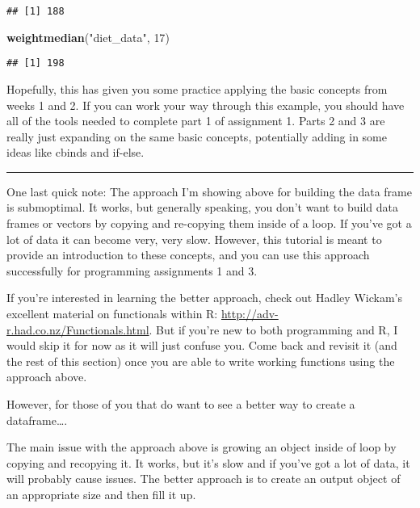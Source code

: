 \documentclass[
]{article}
\newenvironment{Shaded}{\begin{snugshade}}{\end{snugshade}}
\newcommand{\DecValTok}[1]{\textcolor[rgb]{0.00,0.00,0.81}{#1}}
\newcommand{\KeywordTok}[1]{\textcolor[rgb]{0.13,0.29,0.53}{\textbf{#1}}}
\newcommand{\NormalTok}[1]{#1}
\newcommand{\StringTok}[1]{\textcolor[rgb]{0.31,0.60,0.02}{#1}}
\begin{document}
\begin{verbatim}
## [1] 188
\end{verbatim}

\begin{Shaded}
\begin{Highlighting}[]
\KeywordTok{weightmedian}\NormalTok{(}\StringTok{"diet_data"}\NormalTok{, }\DecValTok{17}\NormalTok{)}
\end{Highlighting}
\end{Shaded}

\begin{verbatim}
## [1] 198
\end{verbatim}

Hopefully, this has given you some practice applying the basic concepts
from weeks 1 and 2. If you can work your way through this example, you
should have all of the tools needed to complete part 1 of assignment 1.
Parts 2 and 3 are really just expanding on the same basic concepts,
potentially adding in some ideas like cbinds and if-else.

\begin{center}\rule{0.5\linewidth}{\linethickness}\end{center}

One last quick note: The approach I'm showing above for building the
data frame is submoptimal. It works, but generally speaking, you don't
want to build data frames or vectors by copying and re-copying them
inside of a loop. If you've got a lot of data it can become very, very
slow. However, this tutorial is meant to provide an introduction to
these concepts, and you can use this approach successfully for
programming assignments 1 and 3.

If you're interested in learning the better approach, check out Hadley
Wickam's excellent material on functionals within R:
\url{http://adv-r.had.co.nz/Functionals.html}. But if you're new to both
programming and R, I would skip it for now as it will just confuse you.
Come back and revisit it (and the rest of this section) once you are
able to write working functions using the approach above.

However, for those of you that do want to see a better way to create a
dataframe\ldots.

The main issue with the approach above is growing an object inside of
loop by copying and recopying it. It works, but it's slow and if you've
got a lot of data, it will probably cause issues. The better approach is
to create an output object of an appropriate size and then fill it up.
\end{document}
